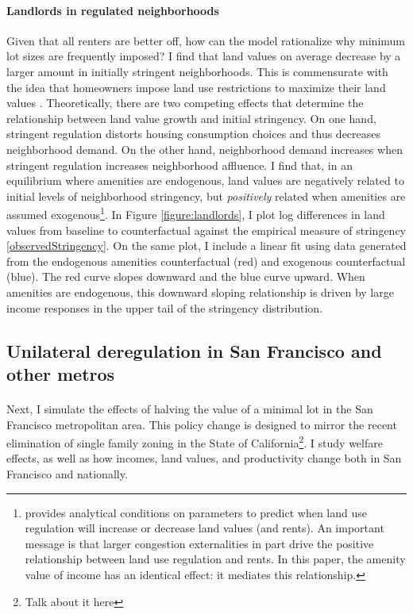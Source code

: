 \documentclass[12pt]{article}
\begin{document}
\paragraph*{Landlords in regulated neighborhoods}
Given that all renters are better off, how can the model rationalize why minimum lot sizes are frequently imposed? I find that land values on average decrease by a larger amount in initially stringent neighborhoods. This is commensurate with the idea that homeowners impose land use restrictions to maximize their land values \citep{parkho, HILBER2013, homevoterhypothesis}. Theoretically, there are two competing effects that determine the relationship between land value growth and initial stringency. On one hand, stringent regulation distorts housing consumption choices and thus decreases neighborhood demand. On the other hand, neighborhood demand increases when stringent regulation increases neighborhood affluence. I find that, in an equilibrium where amenities are endogenous, land values are negatively related to initial levels of neighborhood stringency, but \textit{positively} related when amenities are assumed exogenous\footnote{\cite{parkho} provides analytical conditions on parameters to predict when land use regulation will increase or decrease land values (and rents). An important message is that larger congestion externalities in part drive the positive relationship between land use regulation and rents. In this paper, the amenity value of income has an identical effect: it mediates this relationship.}. In Figure \ref{figure:landlords}, I plot log differences in land values from baseline to counterfactual against the empirical measure of stringency \eqref{observedStringency}. On the same plot, I include a linear fit using data generated from the endogenous amenities counterfactual (red) and exogenous counterfactual (blue). The red curve slopes downward and the blue curve upward. When amenities are endogenous, this downward sloping relationship is driven by large income responses in the upper tail of the stringency distribution. 


\subsection{Unilateral deregulation in San Francisco and other metros}
\paragraph*{}
 Next, I simulate the effects of halving the value of a minimal lot in the San Francisco metropolitan area. This policy change is designed to mirror the recent elimination of single family zoning in the State of California\footnote{Talk about it here}. I study welfare effects, as well as how incomes, land values, and productivity change both in San Francisco and nationally.
\end{document}
